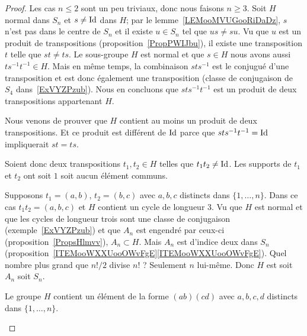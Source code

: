 \begin{proof}
    Les cas \( n\leq 2\) sont un peu triviaux, donc nous faisons \( n\geq 3\). Soit \( H\) normal dans \( S_n\) et \( s\neq \operatorname{Id}\) dans \( H\); par le lemme~\ref{LEMooMVUGooRiDaDz}, \( s\) n'est pas dans le centre de \( S_n\) et il existe \( u\in S_n\) tel que \( us\neq su\). Vu que \( u\) est un produit de transpositions (proposition~\ref{PropPWIJbu}), il existe une transposition \( t\) telle que \( st\neq ts\). Le sous-groupe \( H\) est normal et que \( s\in H\) nous avons aussi \( ts^{-1}t^{-1}\in H\). Mais en même temps, la combinaison \( sts^{-1}\) est le conjugué d'une transposition et est donc également une transposition (classe de conjugaison de \( S_4\) dans~\ref{ExVYZPzub}). Nous en concluons que \( sts^{-1}t^{-1}\) est un produit de deux transpositions appartenant \( H\).

    Nous venons de prouver que \( H\) contient au moins un produit de deux transpositions. Et ce produit est différent de \( \operatorname{Id}\) parce que \( sts^{-1}t^{-1}=\operatorname{Id}\) impliquerait \( st=ts\).

    Soient donc deux transpositions \( t_1,t_2\in H\) telles que \( t_1t_2\neq \operatorname{Id}\). Les supports de \( t_1\) et \( t_2\) ont soit \( 1\) soit aucun élément communs.

    \begin{subproof}
        \item[Premier cas]

            Supposons \( t_1=(a,b)\), \( t_2=(b,c)\) avec \( a,b,c\) distincts dans \( \{ 1,\ldots, n \}\). Dans ce cas \( t_1t_2=(a,b,c)\) et \( H\) contient un cycle de longueur \( 3\). Vu que \( H\) est normal et que les cycles de longueur trois sont une classe de conjugaison (exemple~\ref{ExVYZPzub}) et que \( A_n\) est engendré par ceux-ci (proposition~\ref{PropsHlmvv}), \( A_n\subset H\). Mais \( A_n\) est d'indice deux dans \( S_n\) (proposition~\ref{ITEMooWXXUooOWvFgE}\ref{ITEMooWXXUooOWvFgE}). Quel nombre plus grand que \( n!/2\) divise \( n!\) ? Seulement \( n\) lui-même. Donc \( H\) est soit \( A_n\) soit \( S_n\).

        \item[Second cas]

            Le groupe \( H\) contient un élément de la forme \( (ab)(cd)\) avec \( a,b,c,d\) distincts dans \( \{ 1,\ldots, n \}\).

            \begin{subproof}

                \item[Si \( n=3\)]


\end{subproof}
\end{subproof}
\end{proof}
